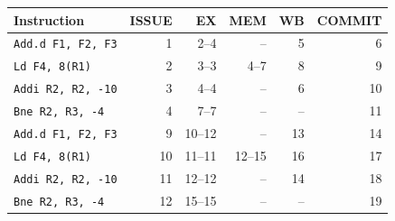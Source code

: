 \begin{tabular}{@{}lrrrrr@{}}\toprule
Instruction & ISSUE & EX & MEM & WB & COMMIT\\\midrule
\texttt{Add.d F1, F2, F3} & 1 & 2--4 & -- & 5 & 6 \\
\texttt{Ld F4, 8(R1)} & 2 & 3--3 & 4--7 & 8 & 9 \\
\texttt{Addi R2, R2, -10} & 3 & 4--4 & -- & 6 & 10 \\
\texttt{Bne R2, R3, -4} & 4 & 7--7 & -- & -- & 11 \\
\texttt{Add.d F1, F2, F3} & 9 & 10--12 & -- & 13 & 14 \\
\texttt{Ld F4, 8(R1)} & 10 & 11--11 & 12--15 & 16 & 17 \\
\texttt{Addi R2, R2, -10} & 11 & 12--12 & -- & 14 & 18 \\
\texttt{Bne R2, R3, -4} & 12 & 15--15 & -- & -- & 19 \\
\bottomrule\end{tabular}